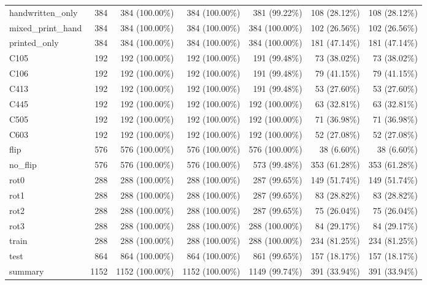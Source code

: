 \begin{longtable}{>{\raggedright\arraybackslash}p{5cm}rrrrrr}
handwritten\_only & 384 & 384 (100.00\%) & 384 (100.00\%) & 381 (99.22\%) & 108 (28.12\%) & 108 (28.12\%) \\
mixed\_print\_hand & 384 & 384 (100.00\%) & 384 (100.00\%) & 384 (100.00\%) & 102 (26.56\%) & 102 (26.56\%) \\
printed\_only & 384 & 384 (100.00\%) & 384 (100.00\%) & 384 (100.00\%) & 181 (47.14\%) & 181 (47.14\%) \\
C105 & 192 & 192 (100.00\%) & 192 (100.00\%) & 191 (99.48\%) & 73 (38.02\%) & 73 (38.02\%) \\
C106 & 192 & 192 (100.00\%) & 192 (100.00\%) & 191 (99.48\%) & 79 (41.15\%) & 79 (41.15\%) \\
C413 & 192 & 192 (100.00\%) & 192 (100.00\%) & 191 (99.48\%) & 53 (27.60\%) & 53 (27.60\%) \\
C445 & 192 & 192 (100.00\%) & 192 (100.00\%) & 192 (100.00\%) & 63 (32.81\%) & 63 (32.81\%) \\
C505 & 192 & 192 (100.00\%) & 192 (100.00\%) & 192 (100.00\%) & 71 (36.98\%) & 71 (36.98\%) \\
C603 & 192 & 192 (100.00\%) & 192 (100.00\%) & 192 (100.00\%) & 52 (27.08\%) & 52 (27.08\%) \\
flip & 576 & 576 (100.00\%) & 576 (100.00\%) & 576 (100.00\%) & 38 (6.60\%) & 38 (6.60\%) \\
no\_flip & 576 & 576 (100.00\%) & 576 (100.00\%) & 573 (99.48\%) & 353 (61.28\%) & 353 (61.28\%) \\
rot0 & 288 & 288 (100.00\%) & 288 (100.00\%) & 287 (99.65\%) & 149 (51.74\%) & 149 (51.74\%) \\
rot1 & 288 & 288 (100.00\%) & 288 (100.00\%) & 287 (99.65\%) & 83 (28.82\%) & 83 (28.82\%) \\
rot2 & 288 & 288 (100.00\%) & 288 (100.00\%) & 287 (99.65\%) & 75 (26.04\%) & 75 (26.04\%) \\
rot3 & 288 & 288 (100.00\%) & 288 (100.00\%) & 288 (100.00\%) & 84 (29.17\%) & 84 (29.17\%) \\
train & 288 & 288 (100.00\%) & 288 (100.00\%) & 288 (100.00\%) & 234 (81.25\%) & 234 (81.25\%) \\
test & 864 & 864 (100.00\%) & 864 (100.00\%) & 861 (99.65\%) & 157 (18.17\%) & 157 (18.17\%) \\
summary & 1152 & 1152 (100.00\%) & 1152 (100.00\%) & 1149 (99.74\%) & 391 (33.94\%) & 391 (33.94\%) \\
\end{longtable}
